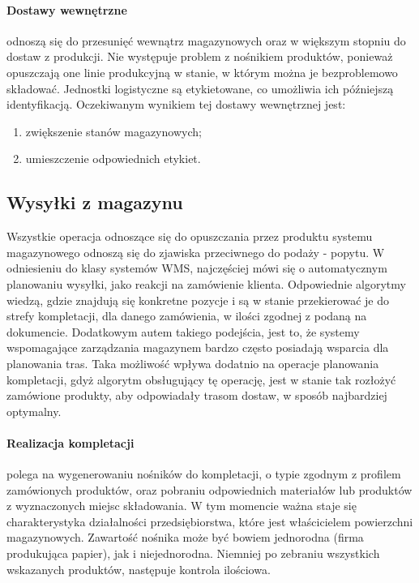 			\paragraph{Dostawy wewnętrzne} odnoszą się do przesunięć wewnątrz magazynowych oraz w większym
			stopniu do dostaw z produkcji. Nie występuje problem z nośnikiem produktów, ponieważ 
			opuszczają one linie produkcyjną w stanie, w którym można je bezproblemowo składować. Jednostki
			logistyczne są etykietowane, co umożliwia ich późniejszą identyfikacją. Oczekiwanym wynikiem tej 
			dostawy wewnętrznej jest:
			\begin{enumerate}
				\item zwiększenie stanów magazynowych;
				\item umieszczenie odpowiednich etykiet.
			\end{enumerate}		 						
	\subsection{Wysyłki z magazynu}
		Wszystkie operacja odnoszące się do opuszczania przez produktu systemu magazynowego odnoszą się do zjawiska
		przeciwnego do podaży - popytu. W odniesieniu do klasy systemów WMS, najczęściej mówi się o automatycznym
		planowaniu wysyłki, jako reakcji na zamówienie klienta. Odpowiednie algorytmy wiedzą, gdzie znajdują
		się konkretne pozycje i są w stanie przekierować je do strefy kompletacji, dla danego zamówienia, w ilości
		zgodnej z podaną na dokumencie. Dodatkowym autem takiego podejścia, jest to, że systemy wspomagające
		zarządzania magazynem bardzo często posiadają wsparcia dla planowania tras. Taka możliwość wpływa dodatnio
		na operacje planowania kompletacji, gdyż algorytm obsługujący tę operację, jest w stanie tak rozłożyć
		zamówione produkty, aby odpowiadały trasom dostaw, w sposób najbardziej optymalny. 		
			\paragraph{Realizacja kompletacji} polega na wygenerowaniu nośników do kompletacji, o typie zgodnym z profilem
			zamówionych produktów, oraz pobraniu odpowiednich materiałów lub produktów z wyznaczonych miejsc
			składowania. W tym momencie ważna staje się charakterystyka działalności przedsiębiorstwa, które jest 
			właścicielem powierzchni magazynowych. Zawartość nośnika może być bowiem jednorodna (firma produkująca
			papier), jak i niejednorodna. Niemniej po zebraniu wszystkich wskazanych produktów, następuje kontrola
			ilościowa.			
